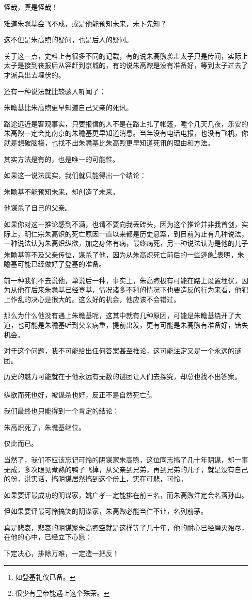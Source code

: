 \begin{multicols}{\theparacolNo}
怪哉，真是怪哉！

难道朱瞻基会飞不成，或是他能预知未来，未卜先知？

这不但是朱高煦的疑问，也是后人的疑问。

关于这一点，史料上有很多不同的记载，有的说朱高煦袭击太子只是传闻，实际上太子是接到丧报后从容赶到京城的，有的说朱高煦是没有准备好，等到太子过去了才派兵出去埋伏的。

还有一种说法就比较骇人听闻了：

朱瞻基比朱高煦更早知道自己父亲的死讯。

路途远近是客观事实，只要报信的人不是在路上扎了帐篷，睡个几天几夜，乐安的朱高煦一定会比南京的朱瞻基更早知道消息。当年没有电话电报，也没有飞机，你就是想破脑袋，也找不出朱瞻基比朱高煦更早知道死讯的理由和方法。

其实方法是有的，也是唯一的可能性。

如果这一说法属实，我们就只能得出一个结论：

朱瞻基不能预知未来，却创造了未来。

他谋杀了自己的父亲。

如果你对这一推论感到不满，也请不要向我丢砖头，因为这个推论并非我首创，实际上，明仁宗朱高炽的死亡原因一直以来都是历史悬案，到目前为止有几种说法，一种说法认为朱高炽纵欲，加之身体有病，最终病死，另一种说法认为是他的儿子朱瞻基等不及父亲传位，谋杀了他，因为从朱高炽死亡前后的一些迹象\footnote{如登基礼仪已备。}表明，朱瞻基可能已经做好了登基的准备。

前一种我们不去说他，单说后一种，事实上，朱高煦极有可能在路上设置埋伏，因为从他在后来朱瞻基已经登基，情况诸多不利的情况下也要造反的行为来看，他犯上作乱的决心是很大的。这么好的机会，他应该不会错过。

那么为什么他没有遇上朱瞻基呢，这其中就有几种原因，可能是朱瞻基绕开了大道，也可能是朱瞻基听到父亲病重，提前出发，更有可能是朱高煦有准备好，错失机会。

对于这个问题，我不可能给出任何答案甚至推论，这可能注定又是一个永远的谜团。

历史的魅力可能就在于他永远有无数的谜团让人们去探究，却总也找不出答案。

纵欲而死也好，被谋杀也好，反正不是自然死亡\footnote{很少有皇帝能遇上这个殊荣。}。

我们最终也只能得到一个肯定的结论：

朱高炽死了，朱瞻基继位。

仅此而已。

当然了，我们不应该忘记可怜的阴谋家朱高煦，这位同志搞了几十年阴谋，却一事无成，多次眼见煮熟的鸭子飞掉，从父亲到兄弟，再到兄弟的儿子，就是没有自己的份，说实话，搞阴谋居然搞到这个份上，实在可悲，可怜。

如果要评最成功的阴谋家，姚广孝一定能排在前三名，而朱高煦注定会名落孙山。

但如果要评最可怜搞笑的阴谋家，朱高煦必能当仁不让，名列前茅。

真是悲哀，悲哀的阴谋家朱高煦空就是这样等了几十年，他的耐心已经磨灭殆尽，在他的心中，已经立下心愿：

下定决心，排除万难，一定造一把反！
\ifnum{}
	\end{multicols}
\fi
\newpage
